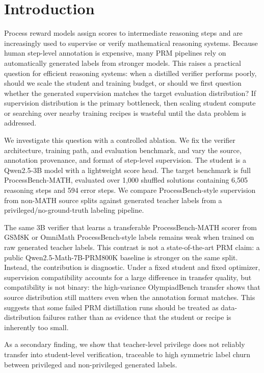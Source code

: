 \documentclass{article}
\begin{document}
\section{Introduction}

Process reward models assign scores to intermediate reasoning steps and are increasingly used to supervise or verify mathematical reasoning systems.
Because human step-level annotation is expensive, many PRM pipelines rely on automatically generated labels from stronger models.
This raises a practical question for efficient reasoning systems: when a distilled verifier performs poorly, should we scale the student and training budget, or should we first question whether the generated supervision matches the target evaluation distribution?
If supervision distribution is the primary bottleneck, then scaling student compute or searching over nearby training recipes is wasteful until the data problem is addressed.

We investigate this question with a controlled ablation.
We fix the verifier architecture, training path, and evaluation benchmark, and vary the source, annotation provenance, and format of step-level supervision.
The student is a Qwen2.5-3B model with a lightweight score head.
The target benchmark is full ProcessBench-MATH, evaluated over 1,000 shuffled solutions containing 6,505 reasoning steps and 594 error steps.
We compare ProcessBench-style supervision from non-MATH source splits against generated teacher labels from a privileged/no-ground-truth labeling pipeline.

The same 3B verifier that learns a transferable ProcessBench-MATH scorer from GSM8K or OmniMath ProcessBench-style labels remains weak when trained on raw generated teacher labels.
This contrast is not a state-of-the-art PRM claim: a public Qwen2.5-Math-7B-PRM800K baseline is stronger on the same split.
Instead, the contribution is diagnostic.
Under a fixed student and fixed optimizer, supervision compatibility accounts for a large difference in transfer quality, but compatibility is not binary: the high-variance OlympiadBench transfer shows that source distribution still matters even when the annotation format matches.
This suggests that some failed PRM distillation runs should be treated as data-distribution failures rather than as evidence that the student or recipe is inherently too small.

As a secondary finding, we show that teacher-level privilege does not reliably transfer into student-level verification, traceable to high symmetric label churn between privileged and non-privileged generated labels.
\end{document}
